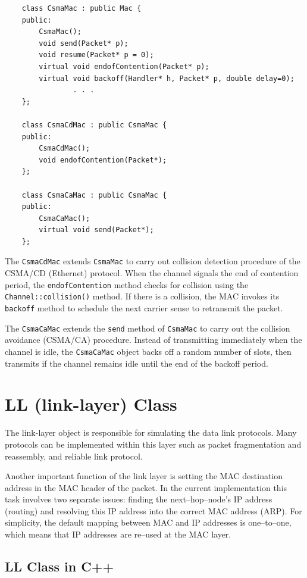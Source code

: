 \begin{verbatim}
    class CsmaMac : public Mac {
    public:
        CsmaMac();
        void send(Packet* p);
        void resume(Packet* p = 0);
        virtual void endofContention(Packet* p);
        virtual void backoff(Handler* h, Packet* p, double delay=0);
                . . .
    };

    class CsmaCdMac : public CsmaMac {
    public:
        CsmaCdMac();
        void endofContention(Packet*);
    };

    class CsmaCaMac : public CsmaMac {
    public:
        CsmaCaMac();
        virtual void send(Packet*);
    };
\end{verbatim}

The {\tt CsmaCdMac} extends {\tt CsmaMac} to carry out collision
detection procedure of the CSMA/CD (Ethernet) protocol.  When the
channel signals the end of contention period, the {\tt endofContention}
method checks for collision using the {\tt Channel::collision()}
method.  If there is a collision, the MAC invokes its {\tt backoff}
method to schedule the next carrier sense to retransmit the packet.

The {\tt CsmaCaMac} extends the {\tt send} method of {\tt CsmaMac} to
carry out the collision avoidance (CSMA/CA) procedure.  Instead of
transmitting immediately when the channel is idle, the {\tt CsmaCaMac}
object backs off a random number of slots, then transmits if the channel
remains idle until the end of the backoff period.

\section{LL (link-layer) Class}
\label{sec:linklayer}

The link-layer object is responsible for simulating the data link
protocols.  Many protocols can be implemented within this layer such
as packet fragmentation and reassembly, and reliable link protocol. 

Another important function of the link layer is setting the MAC
destination address in the MAC header of the packet.  In the current
implementation this task involves two separate issues: finding the
next--hop--node's IP address (routing) and resolving this IP address
into the correct MAC address (ARP).  For simplicity, the default
mapping between MAC and IP addresses is one--to--one, which means that
IP addresses are re--used at the MAC layer.

\subsection{LL Class in C++}
\label{sec:llcplus}

